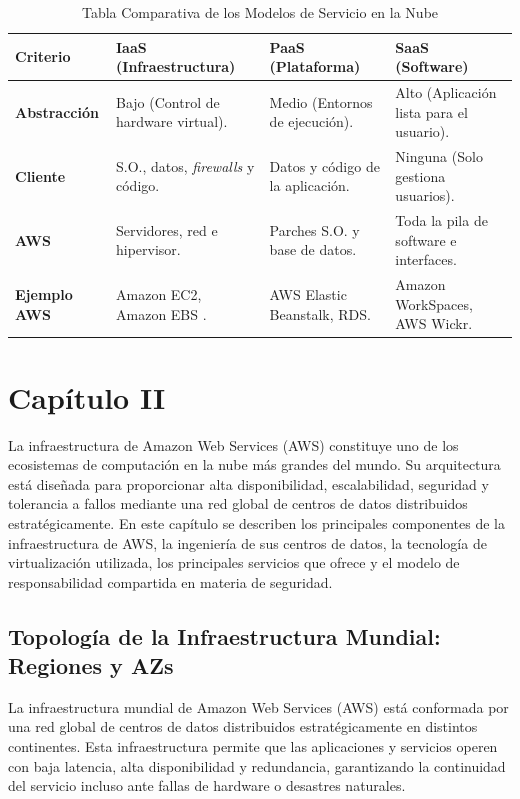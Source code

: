 \documentclass[12pt,a4paper]{article}
\begin{document}
\vspace{0.3cm}
\begin{table}[H]
\centering
\caption{Tabla Comparativa de los Modelos de Servicio en la Nube}
\label{tab:modelos_servicio}
\begin{tabular}{ p{3.2cm} p{3.4cm} p{3.4cm} p{3.4cm} }
\toprule
\textbf{Criterio} & \textbf{IaaS (Infraestructura)} & \textbf{PaaS (Plataforma)} & \textbf{SaaS (Software)} \\
\midrule
\textbf{Abstracción} & Bajo (Control de hardware virtual). & Medio (Entornos de ejecución). & Alto (Aplicación lista para el usuario). \\
\textbf{Cliente} & S.O., datos, \textit{firewalls} y código. & Datos y código de la aplicación. & Ninguna (Solo gestiona usuarios). \\
\textbf{AWS} & Servidores, red e hipervisor. & Parches S.O. y base de datos. & Toda la pila de software e interfaces. \\
\textbf{Ejemplo AWS} & Amazon EC2, Amazon EBS \parencite{varia2014}. & AWS Elastic Beanstalk, RDS. & Amazon WorkSpaces, AWS Wickr. \\
\bottomrule
\end{tabular}
\end{table}
\vspace{0.3cm}

\section{Capítulo II}
La infraestructura de Amazon Web Services (AWS) constituye uno de los ecosistemas de computación en la nube más grandes del mundo. Su arquitectura está diseñada para proporcionar alta disponibilidad, escalabilidad, seguridad y tolerancia a fallos mediante una red global de centros de datos distribuidos estratégicamente. En este capítulo se describen los principales componentes de la infraestructura de AWS, la ingeniería de sus centros de datos, la tecnología de virtualización utilizada, los principales servicios que ofrece y el modelo de responsabilidad compartida en materia de seguridad.

\subsection{Topología de la Infraestructura Mundial: Regiones y AZs}

La infraestructura mundial de Amazon Web Services (AWS) está conformada por una red global de centros de datos distribuidos estratégicamente en distintos continentes. Esta infraestructura permite que las aplicaciones y servicios operen con baja latencia, alta disponibilidad y redundancia, garantizando la continuidad del servicio incluso ante fallas de hardware o desastres naturales\parencite{awsInfrastructure}.
\end{document}
